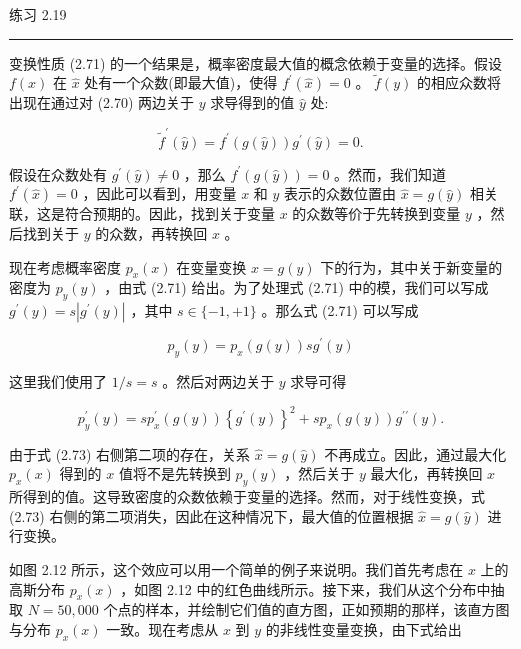 \documentclass[10pt]{report}
\newcommand{\HRule}{\begin{center}\rule{0.9\linewidth}{0.2mm}\end{center}}
\begin{document}
练习 2.19

\HRule

变换性质 (2.71) 的一个结果是，概率密度最大值的概念依赖于变量的选择。假设 \(f\left( x\right)\) 在 \(\widehat{x}\) 处有一个众数(即最大值)，使得 \({f}^{\prime }\left( \widehat{x}\right)  = 0\) 。 \(\widetilde{f}\left( y\right)\) 的相应众数将出现在通过对 (2.70) 两边关于 \(y\) 求导得到的值 \(\widehat{y}\) 处:

\[
{\widetilde{f}}^{\prime }\left( \widehat{y}\right)  = {f}^{\prime }\left( {g\left( \widehat{y}\right) }\right) {g}^{\prime }\left( \widehat{y}\right)  = 0. \tag{2.72}
\]

假设在众数处有 \({g}^{\prime }\left( \widehat{y}\right)  \neq  0\) ，那么 \({f}^{\prime }\left( {g\left( \widehat{y}\right) }\right)  = 0\) 。然而，我们知道 \({f}^{\prime }\left( \widehat{x}\right)  = 0\) ，因此可以看到，用变量 \(x\) 和 \(y\) 表示的众数位置由 \(\widehat{x} = g\left( \widehat{y}\right)\) 相关联，这是符合预期的。因此，找到关于变量 \(x\) 的众数等价于先转换到变量 \(y\) ，然后找到关于 \(y\) 的众数，再转换回 \(x\) 。

现在考虑概率密度 \({p}_{x}\left( x\right)\) 在变量变换 \(x = g\left( y\right)\) 下的行为，其中关于新变量的密度为 \({p}_{y}\left( y\right)\) ，由式 (2.71) 给出。为了处理式 (2.71) 中的模，我们可以写成 \({g}^{\prime }\left( y\right)  = s\left| {{g}^{\prime }\left( y\right) }\right|\) ，其中 \(s \in  \{  - 1, + 1\}\) 。那么式 (2.71) 可以写成

\[
{p}_{y}\left( y\right)  = {p}_{x}\left( {g\left( y\right) }\right) s{g}^{\prime }\left( y\right)
\]

这里我们使用了 \(1/s = s\) 。然后对两边关于 \(y\) 求导可得

\[
{p}_{y}^{\prime }\left( y\right)  = s{p}_{x}^{\prime }\left( {g\left( y\right) }\right) {\left\{  {g}^{\prime }\left( y\right) \right\}  }^{2} + s{p}_{x}\left( {g\left( y\right) }\right) {g}^{\prime \prime }\left( y\right) . \tag{2.73}
\]

由于式 (2.73) 右侧第二项的存在，关系 \(\widehat{x} = g\left( \widehat{y}\right)\) 不再成立。因此，通过最大化 \({p}_{x}\left( x\right)\) 得到的 \(x\) 值将不是先转换到 \({p}_{y}\left( y\right)\) ，然后关于 \(y\) 最大化，再转换回 \(x\) 所得到的值。这导致密度的众数依赖于变量的选择。然而，对于线性变换，式 (2.73) 右侧的第二项消失，因此在这种情况下，最大值的位置根据 \(\widehat{x} = g\left( \widehat{y}\right)\) 进行变换。

如图 2.12 所示，这个效应可以用一个简单的例子来说明。我们首先考虑在 \(x\) 上的高斯分布 \({p}_{x}\left( x\right)\) ，如图 2.12 中的红色曲线所示。接下来，我们从这个分布中抽取 \(N = {50},{000}\) 个点的样本，并绘制它们值的直方图，正如预期的那样，该直方图与分布 \({p}_{x}\left( x\right)\) 一致。现在考虑从 \(x\) 到 \(y\) 的非线性变量变换，由下式给出
\end{document}
